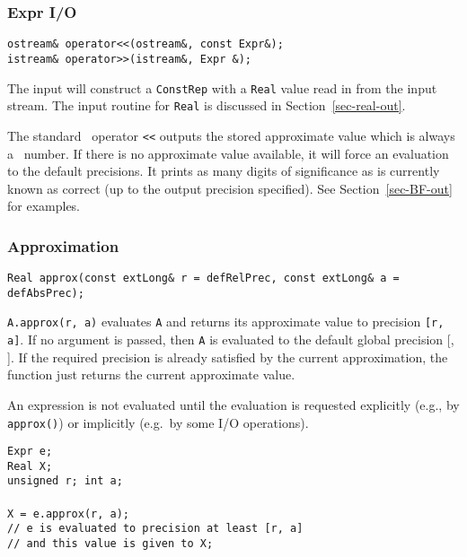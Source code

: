 \bigskip

\subsubsection{Expr I/O}


\begin{progb} {
\> \tt  ostream\& operator<<(ostream\&, const Expr\&); \\
\> \tt  istream\& operator>>(istream\&, Expr \&);
}\end{progb}

The input will construct a {\tt ConstRep} with a {\tt Real} value
read in from the input stream. The input routine for {\tt Real} is
discussed in Section~\ref{sec-real-out}.

The standard \cpp\ operator {\tt <<} outputs the stored approximate 
value which is always a \BF\ number. If there is no
approximate value available, it will force an evaluation to the
default precisions.
It prints as many digits of significance as is currently known as correct 
(up to the output precision specified). See Section~\ref{sec-BF-out} for 
examples.

\subsubsection{Approximation}
\begin{progb} {
\> \tt Real approx(const extLong\& r = defRelPrec, const extLong\& a = defAbsPrec);
}\end{progb}


{\tt A.approx(r, a)} evaluates {\tt A} and returns its approximate value
to precision {\tt [r, a]}. If no argument is passed, then {\tt A} is
evaluated to the default global precision [, ]. If the
required precision is already satisfied by the current approximation, 
the function just returns the current approximate value. 

An expression is not evaluated until the evaluation is 
requested explicitly (e.g., by {\tt approx()}) or implicitly 
(e.g.\ by some I/O operations).

\nopagebreak
\begin{progb}{
\> \tt Expr e; \\
\> \tt Real X; \\
\> \tt unsigned r; int a; \\
\\
\> \tt X = e.approx(r, a); \\
\> // {\tt e} is evaluated to precision at least \tt [r, a] \\
\> // and this value is given to {\tt X};
}\end{progb}


